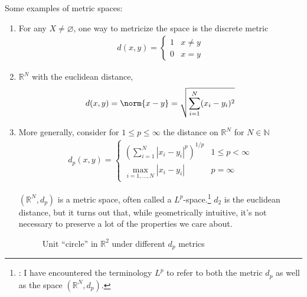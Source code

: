 \documentclass{article}
\begin{document}
Some examples of metric spaces:
\begin{enumerate}
  \item For any $X \ne \varnothing$, one way to metricize the space is the discrete metric
    \begin{align*}
      d(x, y) = \begin{cases}
        1 & x \ne y \\
        0 & x = y
      \end{cases}
    \end{align*}

  \item $\mathbb{R}^N$ with the euclidean distance,
    \begin{align*}
      d(x, y)
      = \norm{x - y}
      = \sqrt{\sum^{N}_{i = 1} (x_i - y_i)^2}
    \end{align*}

  \item More generally, consider for $1 \le p \le \infty$ the distance on $\mathbb{R}^N$ for $N \in \mathbb{N}$
    \begin{align*}
      d_p(x, y)
      =
      \begin{cases}
        \left(\displaystyle\sum^{N}_{i = 1} |x_i - y_i|^p\right)^{1 / p}
          & 1 \le p < \infty \\[12pt]
        \displaystyle\max_{i = 1, \ldots, N} |x_i - y_i|
          & p = \infty
      \end{cases}
    \end{align*}

    $(\mathbb{R}^N, d_p)$ is a metric space, often called a $L^p$-space.\footnote{\NB: I have encountered the terminology $L^p$ to refer to both the metric $d_p$ as well as the space $(\mathbb{R}^N, d_p)$.} $d_2$ is the euclidean distance, but it turns out that, while geometrically intuitive, it's not necessary to preserve a lot of the properties we care about.
    \begin{figure}[H]
      \centering
      \caption{Unit ``circle'' in $\mathbb{R}^2$ under different $d_p$ metrics}
      \label{fig:unit_circle_in_r_2_under_different_d_p_metrics}
\end{figure}
\end{enumerate}
\end{document}
